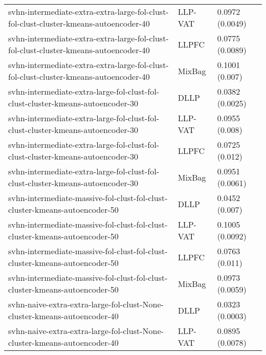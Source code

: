 \begin{longtable}{lll}
                        svhn-intermediate-extra-extra-large-fol-clust-fol-clust-cluster-kmeans-autoencoder-40 &   LLP-VAT &                       0.0972 (0.0049) \\
                        svhn-intermediate-extra-extra-large-fol-clust-fol-clust-cluster-kmeans-autoencoder-40 &     LLPFC &                       0.0775 (0.0089) \\
                        svhn-intermediate-extra-extra-large-fol-clust-fol-clust-cluster-kmeans-autoencoder-40 &    MixBag &                        0.1001 (0.007) \\
                              svhn-intermediate-extra-large-fol-clust-fol-clust-cluster-kmeans-autoencoder-30 &      DLLP &                       0.0382 (0.0025) \\
                              svhn-intermediate-extra-large-fol-clust-fol-clust-cluster-kmeans-autoencoder-30 &   LLP-VAT &                        0.0955 (0.008) \\
                              svhn-intermediate-extra-large-fol-clust-fol-clust-cluster-kmeans-autoencoder-30 &     LLPFC &                        0.0725 (0.012) \\
                              svhn-intermediate-extra-large-fol-clust-fol-clust-cluster-kmeans-autoencoder-30 &    MixBag &                       0.0951 (0.0061) \\
                                  svhn-intermediate-massive-fol-clust-fol-clust-cluster-kmeans-autoencoder-50 &      DLLP &                        0.0452 (0.007) \\
                                  svhn-intermediate-massive-fol-clust-fol-clust-cluster-kmeans-autoencoder-50 &   LLP-VAT &                       0.1005 (0.0092) \\
                                  svhn-intermediate-massive-fol-clust-fol-clust-cluster-kmeans-autoencoder-50 &     LLPFC &                        0.0763 (0.011) \\
                                  svhn-intermediate-massive-fol-clust-fol-clust-cluster-kmeans-autoencoder-50 &    MixBag &                       0.0973 (0.0059) \\
                                    svhn-naive-extra-extra-large-fol-clust-None-cluster-kmeans-autoencoder-40 &      DLLP &                       0.0323 (0.0003) \\
                                    svhn-naive-extra-extra-large-fol-clust-None-cluster-kmeans-autoencoder-40 &   LLP-VAT &                       0.0895 (0.0078) \\

\end{longtable}
